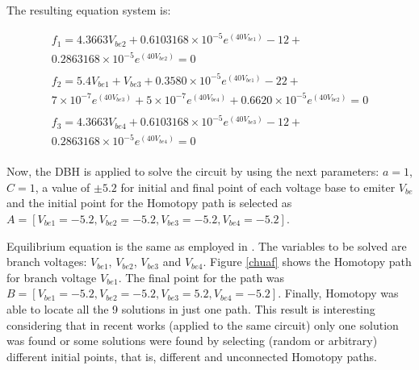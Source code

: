 \documentclass[conference,letterpaper,twocolumn]{IEEEtran}
\begin{document}
The resulting equation system is:

{\tiny
\begin{equation}
\begin{array}{l}
f_1=4.3663V_{be2}+0.6103168 \times 10^{-5} e^{(40V_{be1})}-12 + \\ 0.2863168\times 10^{-5}e^{(40V_{be2})}=0 \\ \\
f_2=5.4V_{be1}+V_{be3}+0.3580\times 10^{-5}e^{(40V_{be1})}-22 + \\7\times 10^{-7}e^{(40V_{be3})}+  5\times 10^{-7}e^{(40V_{be4})}+0.6620\times 10^{-5}e^{(40V_{be2})}=0 \\ \\
f_3=4.3663V_{be4}+0.6103168\times 10^{-5}e^{(40V_{be3})}-12 + \\0.2863168\times 10^{-5}e^{(40V_{be4})}=0 \\
\end{array}
\end{equation}
}

Now, the DBH is applied to solve the circuit by using the next parameters: $a=1$, $C=1$, a value of $\pm 5.2$
for initial and final point of each voltage base to emiter $V_{be}$ and the initial point for the Homotopy path is selected as $A=[V_{be1}=-5.2,V_{be2}=-5.2,V_{be3}=-5.2,V_{be4}=-5.2]$.

Equilibrium equation is the same as employed in \cite{homo_chua}. The variables to be solved are branch voltages: $V_{be1}$, $V_{be2}$, $V_{be3}$ and $V_{be4}$. Figure \ref{chuaf} shows the Homotopy path for branch voltage $V_{be1}$. The final point for the path was $B=[V_{be1}=-5.2,V_{be2}=-5.2,V_{be3}=5.2,V_{be4}=-5.2]$. Finally, Homotopy was able to locate all the 9 solutions in just one path. This result is interesting considering that in recent works \cite{homo_yamamura}\cite{homo_jaewook} (applied to the same circuit) only one solution was found or some solutions were found by selecting (random or arbitrary) different initial points, that is, different and unconnected Homotopy paths.
\end{document}
